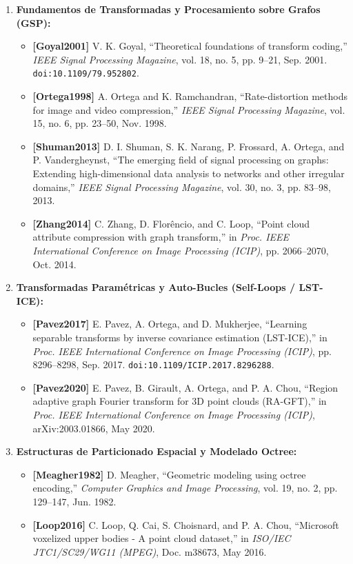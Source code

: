 \documentclass[11pt,a4paper]{article}
\begin{document}
\begin{enumerate}
  \item \textbf{Fundamentos de Transformadas y Procesamiento sobre Grafos (GSP):}
  \begin{itemize}
    \item \textbf{[Goyal2001]} V. K. Goyal, ``Theoretical foundations of transform coding,'' \textit{IEEE Signal Processing Magazine}, vol. 18, no. 5, pp. 9--21, Sep. 2001. \texttt{doi:10.1109/79.952802}.
    \item \textbf{[Ortega1998]} A. Ortega and K. Ramchandran, ``Rate-distortion methods for image and video compression,'' \textit{IEEE Signal Processing Magazine}, vol. 15, no. 6, pp. 23--50, Nov. 1998.
    \item \textbf{[Shuman2013]} D. I. Shuman, S. K. Narang, P. Frossard, A. Ortega, and P. Vandergheynst, ``The emerging field of signal processing on graphs: Extending high-dimensional data analysis to networks and other irregular domains,'' \textit{IEEE Signal Processing Magazine}, vol. 30, no. 3, pp. 83--98, 2013.
    \item \textbf{[Zhang2014]} C. Zhang, D. Flor\^encio, and C. Loop, ``Point cloud attribute compression with graph transform,'' in \textit{Proc. IEEE International Conference on Image Processing (ICIP)}, pp. 2066--2070, Oct. 2014.
  \end{itemize}

  \item \textbf{Transformadas Paramétricas y Auto-Bucles (Self-Loops / LST-ICE):}
  \begin{itemize}
    \item \textbf{[Pavez2017]} E. Pavez, A. Ortega, and D. Mukherjee, ``Learning separable transforms by inverse covariance estimation (LST-ICE),'' in \textit{Proc. IEEE International Conference on Image Processing (ICIP)}, pp. 8296--8298, Sep. 2017. \texttt{doi:10.1109/ICIP.2017.8296288}.
    \item \textbf{[Pavez2020]} E. Pavez, B. Girault, A. Ortega, and P. A. Chou, ``Region adaptive graph Fourier transform for 3D point clouds (RA-GFT),'' in \textit{Proc. IEEE International Conference on Image Processing (ICIP)}, arXiv:2003.01866, May 2020.
  \end{itemize}

  \item \textbf{Estructuras de Particionado Espacial y Modelado Octree:}
  \begin{itemize}
    \item \textbf{[Meagher1982]} D. Meagher, ``Geometric modeling using octree encoding,'' \textit{Computer Graphics and Image Processing}, vol. 19, no. 2, pp. 129--147, Jun. 1982.
    \item \textbf{[Loop2016]} C. Loop, Q. Cai, S. Choisnard, and P. A. Chou, ``Microsoft voxelized upper bodies - A point cloud dataset,'' in \textit{ISO/IEC JTC1/SC29/WG11 (MPEG)}, Doc. m38673, May 2016.
  \end{itemize}


\end{enumerate}
\end{document}
